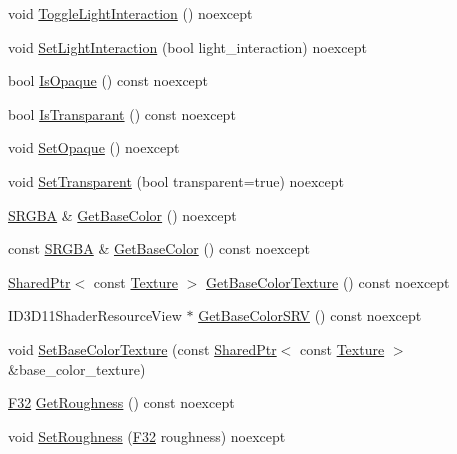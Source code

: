 \begin{DoxyCompactItemize}
\item 
void \hyperlink{classmage_1_1_material_a9c8c15d426461b4a597b9a9947a7bd62}{Toggle\+Light\+Interaction} () noexcept
\item 
void \hyperlink{classmage_1_1_material_a9b0bcb448cf9c96bcb63dcbc0f110bd1}{Set\+Light\+Interaction} (bool light\+\_\+interaction) noexcept
\item 
bool \hyperlink{classmage_1_1_material_a0df1804c29bfd9d2bbc606d6285dccec}{Is\+Opaque} () const noexcept
\item 
bool \hyperlink{classmage_1_1_material_a6a62e3889887e77259070e1f9cd9150f}{Is\+Transparant} () const noexcept
\item 
void \hyperlink{classmage_1_1_material_ab3c49ab54603adebb1d08803fc700fc9}{Set\+Opaque} () noexcept
\item 
void \hyperlink{classmage_1_1_material_abf7e618017185ea05c72d050e89018fe}{Set\+Transparent} (bool transparent=true) noexcept
\item 
\hyperlink{structmage_1_1_s_r_g_b_a}{S\+R\+G\+BA} \& \hyperlink{classmage_1_1_material_a8c6c6e3bb527b98320446206306c6979}{Get\+Base\+Color} () noexcept
\item 
const \hyperlink{structmage_1_1_s_r_g_b_a}{S\+R\+G\+BA} \& \hyperlink{classmage_1_1_material_abadf5557a1047cb7c371c715e99876a3}{Get\+Base\+Color} () const noexcept
\item 
\hyperlink{namespacemage_a1e01ae66713838a7a67d30e44c67703e}{Shared\+Ptr}$<$ const \hyperlink{classmage_1_1_texture}{Texture} $>$ \hyperlink{classmage_1_1_material_a76b84c808a281589d60ebbe2e2932c01}{Get\+Base\+Color\+Texture} () const noexcept
\item 
I\+D3\+D11\+Shader\+Resource\+View $\ast$ \hyperlink{classmage_1_1_material_aef6ae5f87347d9e4bf798079aa906dd3}{Get\+Base\+Color\+S\+RV} () const noexcept
\item 
void \hyperlink{classmage_1_1_material_add87c1ebf7783980ac21e986c080505b}{Set\+Base\+Color\+Texture} (const \hyperlink{namespacemage_a1e01ae66713838a7a67d30e44c67703e}{Shared\+Ptr}$<$ const \hyperlink{classmage_1_1_texture}{Texture} $>$ \&base\+\_\+color\+\_\+texture)
\item 
\hyperlink{namespacemage_aa97e833b45f06d60a0a9c4fc22ae02c0}{F32} \hyperlink{classmage_1_1_material_a5b1a4e965f812e18594cf7455d49139c}{Get\+Roughness} () const noexcept
\item 
void \hyperlink{classmage_1_1_material_ad1df4026da1b5abc3924c7ce09a81a02}{Set\+Roughness} (\hyperlink{namespacemage_aa97e833b45f06d60a0a9c4fc22ae02c0}{F32} roughness) noexcept

\end{DoxyCompactItemize}
